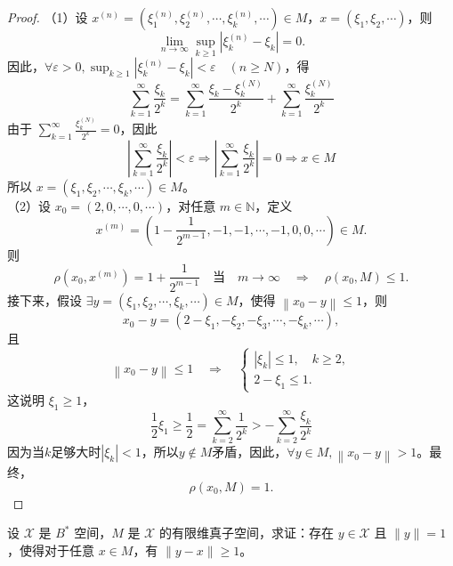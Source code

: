 \documentclass[lang=cn,newtx,10pt,scheme=chinese,thmcnt=chapter]{elegantbook}
\begin{document}
\begin{proof}
（1）设 $x^{(n)} = (\xi_1^{(n)}, \xi_2^{(n)}, \cdots, \xi_k^{(n)}, \cdots) \in M$，$x = (\xi_1, \xi_2, \cdots)$，则
\[
\lim_{n \to \infty} \sup_{k \geqslant 1} \left|\xi_k^{(n)} - \xi_k\right| = 0.
\]
因此，$\forall \varepsilon > 0, \sup_{k \geqslant 1} \left|\xi_k^{(n)} - \xi_k\right| < \varepsilon \quad (n \geqslant N)$，得
\[
\sum_{k=1}^{\infty} \frac{\xi_k}{2^k} = \sum_{k=1}^{\infty} \frac{\xi_k - \xi_k^{(N)}}{2^k} + {\sum_{k=1}^{\infty} \frac{\xi_k^{(N)}}{2^k}}
\]
由于 $\sum_{k=1}^{\infty} \frac{\xi_k^{(N)}}{2^k} = 0$，因此
\[
|\sum_{k=1}^{\infty} \frac{\xi_k}{2^k}| <\varepsilon\Rightarrow |\sum_{k=1}^{\infty} \frac{\xi_k}{2^k}|=0\Rightarrow x\in M
\]
所以 $x = (\xi_1, \xi_2, \cdots, \xi_k, \cdots) \in M$。\\
（2）设 $x_0 = (2, 0, \cdots, 0, \cdots)$，对任意 $m \in \mathbb{N}$，定义
\[
x^{(m)}= \left( 1 - \frac{1}{2^{m-1}}, -1, -1, \cdots, -1, 0, 0, \cdots \right) \in M.
\]
则
\[
\rho(x_0, x^{(m)}) = 1 + \frac{1}{2^{m-1}} \quad \text{当} \quad m \to \infty \quad \Rightarrow \quad \rho(x_0, M) \leqslant 1.
\]
接下来，假设 $\exists y = (\xi_1, \xi_2, \cdots, \xi_k, \cdots) \in M$，使得 $\left\| x_0 - y \right\| \leqslant 1$，则
\[
x_0 - y = \left( 2 - \xi_1, -\xi_2, -\xi_3, \cdots, -\xi_k, \cdots \right),
\]
且
\[
\left\| x_0 - y \right\| \leqslant 1 \quad \Rightarrow \quad \left\{
\begin{array}{l}
|\xi_k| \leqslant 1, \quad k \geqslant 2, \\
2 - \xi_1 \leqslant 1.
\end{array}
\right.
\]
这说明 $\xi_1 \geqslant 1$，
\[
\frac{1}{2}\xi_1\geqslant \frac{1}{2}=\sum\limits_{k=2}^\infty\frac{1}{2^k}> -\sum\limits_{k=2}^\infty \frac{\xi_k}{2^k}
\]
因为当$k$足够大时$|\xi_k|<1$，所以$y\notin M$矛盾，因此，$\forall y \in M, \left\| x_0 - y \right\| > 1$。最终，
\[
\rho(x_0, M) = 1.
\]
\end{proof}
\begin{example}
设 $\mathscr{X}$ 是 $B^*$ 空间，$M$ 是 $\mathscr{X}$ 的有限维真子空间，求证：存在 $y \in \mathscr{X}$ 且 $\|y\| = 1$，使得对于任意 $x \in M$，有 $\|y - x\| \geqslant 1$。
\end{example}
\end{document}
